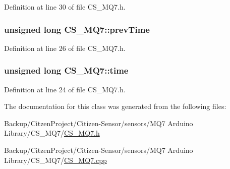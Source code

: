 Definition at line 30 of file C\+S\+\_\+\+M\+Q7.\+h.

\subsubsection[{\texorpdfstring{prev\+Time}{prevTime}}]{\setlength{\rightskip}{0pt plus 5cm}unsigned long C\+S\+\_\+\+M\+Q7\+::prev\+Time}\hypertarget{class_c_s___m_q7_a0e6e2f3cc2f904ada3e8ecb958b3f9b4}{}\label{class_c_s___m_q7_a0e6e2f3cc2f904ada3e8ecb958b3f9b4}


Definition at line 26 of file C\+S\+\_\+\+M\+Q7.\+h.

\subsubsection[{\texorpdfstring{time}{time}}]{\setlength{\rightskip}{0pt plus 5cm}unsigned long C\+S\+\_\+\+M\+Q7\+::time}\hypertarget{class_c_s___m_q7_ada0bcce0de51abdcf9a4f4a4150d265a}{}\label{class_c_s___m_q7_ada0bcce0de51abdcf9a4f4a4150d265a}


Definition at line 24 of file C\+S\+\_\+\+M\+Q7.\+h.



The documentation for this class was generated from the following files\+:\begin{DoxyCompactItemize}
\item 
Backup/\+Citzen\+Project/\+Citizen-\/\+Sensor/sensors/\+M\+Q7 Arduino Library/\+C\+S\+\_\+\+M\+Q7/\hyperlink{_m_q7_01_arduino_01_library_2_c_s___m_q7_2_c_s___m_q7_8h}{C\+S\+\_\+\+M\+Q7.\+h}\item 
Backup/\+Citzen\+Project/\+Citizen-\/\+Sensor/sensors/\+M\+Q7 Arduino Library/\+C\+S\+\_\+\+M\+Q7/\hyperlink{_m_q7_01_arduino_01_library_2_c_s___m_q7_2_c_s___m_q7_8cpp}{C\+S\+\_\+\+M\+Q7.\+cpp}\end{DoxyCompactItemize}
